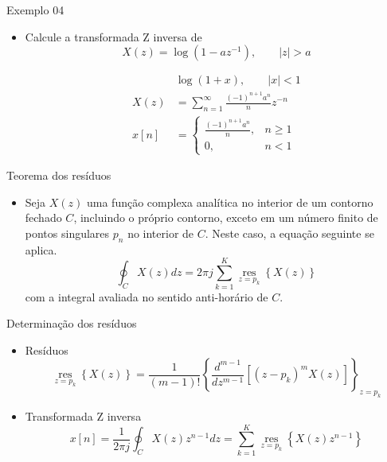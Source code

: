 \begin{slide}{Exemplo 04}
\begin{itemize}
   \item Calcule a transformada Z inversa de
   \begin{equation*}
       X(z) = \log (1-az^{-1}), \qquad |z|>a
   \end{equation*}
    
   \begin{align*}
         & \log(1+x), \qquad |x|<1\\ %
        X(z) &= \sum_{n=1}^\infty\frac{(-1)^{n+1}a^n}{n}z^{-n}\\%
        x[n] &= \begin{cases}\frac{(-1)^{n+1}a^n}{n}, & n\geq 1\\ 0, & n<1 \end{cases}%
      \end{align*}
   
\end{itemize}
\end{slide}

\begin{slide}{Teorema dos resíduos}
\begin{itemize}
   \item Seja $X(z)$ uma função complexa analítica no interior de um contorno fechado $C$, incluindo o próprio contorno, exceto em um número finito de pontos singulares $p_n$ no interior de $C$. Neste caso, a equação seguinte se aplica.
   \begin{equation*}
      \oint_{C}{X(z)dz} = 2\pi j \sum_{k = 1}^{K}\operatorname*{res}_{z = p_k}\left \{ X(z)\right \}
   \end{equation*}
   com a integral avaliada no sentido anti-horário de $C$.
\end{itemize}
\end{slide}

\begin{slide}{Determinação dos resíduos}
\begin{itemize}
   \item Resíduos
   \begin{equation*}
      \operatorname*{res}_{z = p_k} \left \{ X(z)\right \}= \frac{1}{\left ( m - 1 \right )! }\left \{ \frac{d^{m-1}}{dz^{m-1}} \left [ \left ( z-p_k \right )^m X\left ( z\right )\right ]\right \}_{z = p_k}
   \end{equation*}
   \item Transformada Z inversa
   \begin{equation*}
      x[n] = \frac{1}{2\pi j}\oint_{C}{X(z)z^{n-1}dz} = \sum_{k = 1}^{K}\operatorname*{res}_{z = p_k}\left \{ X(z)z^{n-1}\right \}
   \end{equation*}
\end{itemize}
\end{slide}

